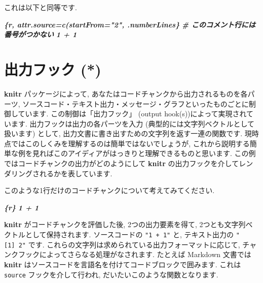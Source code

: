 \documentclass[
  11pt,
]{bxjsreport}
\newenvironment{Shaded}{\begin{snugshade}}{\end{snugshade}}
\newcommand{\InformationTok}[1]{\textcolor[rgb]{0.56,0.35,0.01}{\textbf{\textit{#1}}}}
\begin{document}
これは以下と同等です.

\begin{Shaded}
\begin{Highlighting}[]
\InformationTok{\textasciigrave{}\textasciigrave{}\textasciigrave{}\{r, attr.source=c(\textquotesingle{}startFrom="2"\textquotesingle{}, \textquotesingle{}.numberLines\textquotesingle{}\}}
\InformationTok{\# このコメント行には番号がつかない}
\InformationTok{1 + 1}
\InformationTok{\textasciigrave{}\textasciigrave{}\textasciigrave{}}
\end{Highlighting}
\end{Shaded}

\hypertarget{output-hooks}{%
\chapter{出力フック (*)}\label{output-hooks}}

\textbf{knitr} パッケージによって, あなたはコードチャンクから出力されるものを各パーツ, ソースコード・テキスト出力・メッセージ・グラフといったものごとに制御しています. この制御は「出力フック」 (output hook(s))によって実現されています. 出力フックは出力の各パーツを入力 (典型的には文字列ベクトルとして扱います) として, 出力文書に書き出すための文字列を返す一連の関数です. 現時点ではこのしくみを理解するのは簡単ではないでしょうが, これから説明する簡単な例を見ればこのアイディアがはっきりと理解できるものと思います. この例ではコードチャンクの出力がどのようにして \textbf{knitr} の出力フックを介してレンダリングされるかを表しています.

このような1行だけのコードチャンクについて考えてみてください.

\begin{Shaded}
\begin{Highlighting}[]
\InformationTok{\textasciigrave{}\textasciigrave{}\textasciigrave{}\{r\}}
\InformationTok{1 + 1}
\InformationTok{\textasciigrave{}\textasciigrave{}\textasciigrave{}}
\end{Highlighting}
\end{Shaded}

\textbf{knitr} がコードチャンクを評価した後, 2つの出力要素を得て, 2つとも文字列ベクトルとして保持されます. ソースコードの \texttt{"1 + 1"} と, テキスト出力の \texttt{"{[}1{]}\ 2"} です. これらの文字列は求められている出力フォーマットに応じて, チャンクフックによってさらなる処理がなされます. たとえば Markdown 文書では \textbf{knitr} はソースコードを言語名を付けてコードブロックで囲みます. これは \texttt{source} フックを介して行われ, だいたいこのような関数となります.
\end{document}
